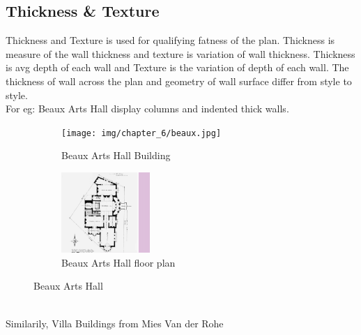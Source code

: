                 \subsection{Thickness \& Texture}
                        Thickness and Texture is used for qualifying fatness of the plan. Thickness is measure of the wall thickness and texture is variation of wall thickness. Thickness is avg depth of each wall and Texture is the variation of depth of each wall. The thickness of wall across the plan and geometry of wall surface differ from style to style. \\
                        For eg: Beaux Arts Hall display columns and indented thick walls.
                        \begin{figure}[h]
                                \centering 
                                \begin{subfigure}{.4\textwidth}
                                        \centering
                                        \texttt{[image: img/chapter\_6/beaux.jpg]}
                                        \caption{ Beaux Arts Hall Building}
                                        \label{fig: Beaux Arts Hall Building}
                                \end{subfigure}
                                \begin{subfigure}{.4\textwidth}
                                        \centering
                                        \includegraphics[height=1.2in]{img/chapter_6/Beaux-Arts-floorplan.png}
                                        \caption{Beaux Arts Hall floor plan}
                                        \label{fig: Beaux Arts Hall floor plan}
                                \end{subfigure}
                                \caption{Beaux Arts Hall}
                                \label{fig: Beaux Arts Hall}
                        \end{figure}
                        \\
                        \noindent
                        Similarily, Villa Buildings from Mies Van der Rohe 
